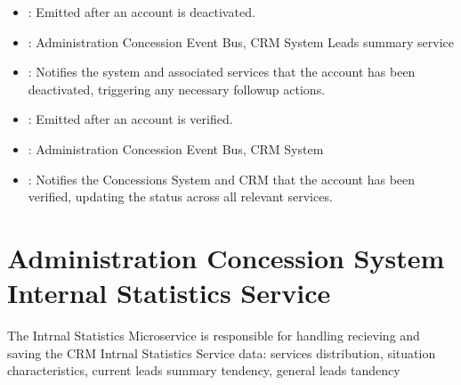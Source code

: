 \documentclass[letterpaper,10pt,english]{sphinxmanual}
\begin{document}
\sphinxAtStartPar
{}
\begin{itemize}
\item {} 
\sphinxAtStartPar
{}: Emitted after an account is deactivated.

\item {} 
\sphinxAtStartPar
{}: Administration Concession Event Bus, CRM System Leads summary service

\item {} 
\sphinxAtStartPar
{}: Notifies the system and associated services that the account has been deactivated, triggering any necessary follow\sphinxhyphen{}up actions.

\end{itemize}

\sphinxAtStartPar
{}
\begin{itemize}
\item {} 
\sphinxAtStartPar
{}: Emitted after an account is verified.

\item {} 
\sphinxAtStartPar
{}: Administration Concession Event Bus, CRM System

\item {} 
\sphinxAtStartPar
{}: Notifies the Concessions System and CRM that the account has been verified, updating the status across all relevant services.

\end{itemize}

\sphinxstepscope


\section{Administration Concession System Internal Statistics Service}
\label{\detokenize{administration_concession_system/internal_satistics_service:administration-concession-system-internal-statistics-service}}\label{\detokenize{administration_concession_system/internal_satistics_service::doc}}
\sphinxAtStartPar
The Intrnal Statistics Microservice is responsible for handling recieving and saving  the CRM Intrnal Statistics Service data: services distribution, situation characteristics, current leads summary tendency, general leads tandency

\end{document}
